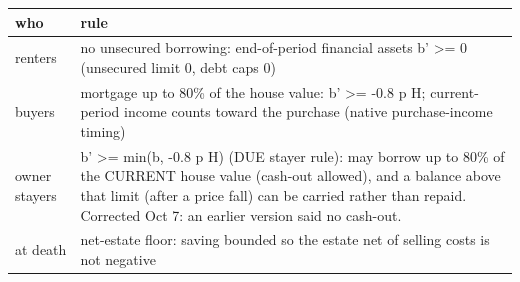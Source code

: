 \begingroup\small
\setlength{\tabcolsep}{3pt}
\renewcommand{\arraystretch}{1.04}
\begin{tabularx}{\linewidth}{XX}
\toprule
who & rule \\
\midrule
renters & no unsecured borrowing: end-of-period financial assets b' \textgreater{}= 0 (unsecured limit 0, debt caps 0) \\
buyers & mortgage up to 80\% of the house value: b' \textgreater{}= -0.8 p H; current-period income counts toward the purchase (native purchase-income timing) \\
owner stayers & b' \textgreater{}= min(b, -0.8 p H) (DUE stayer rule): may borrow up to 80\% of the CURRENT house value (cash-out allowed), and a balance above that limit (after a price fall) can be carried rather than repaid. Corrected Oct 7: an earlier version said no cash-out. \\
at death & net-estate floor: saving bounded so the estate net of selling costs is not negative \\
\bottomrule
\end{tabularx}
\endgroup
